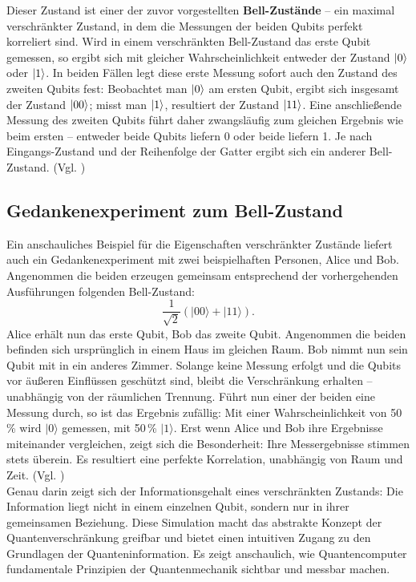 Dieser Zustand ist einer der zuvor vorgestellten \textbf{Bell-Zustände} – ein maximal verschränkter Zustand, in dem die Messungen der beiden Qubits perfekt korreliert sind. Wird in einem verschränkten Bell-Zustand das erste Qubit gemessen, so ergibt sich mit gleicher Wahrscheinlichkeit entweder der Zustand \( \ket{0} \) oder \( \ket{1} \). In beiden Fällen legt diese erste Messung sofort auch den Zustand des zweiten Qubits fest: Beobachtet man \( \ket{0} \) am ersten Qubit, ergibt sich insgesamt der Zustand \( \ket{00} \); misst man \( \ket{1} \), resultiert der Zustand \( \ket{11} \). Eine anschließende Messung des zweiten Qubits führt daher zwangsläufig zum gleichen Ergebnis wie beim ersten – entweder beide Qubits liefern 0 oder beide liefern 1. Je nach Eingangs-Zustand und der Reihenfolge der Gatter ergibt sich ein anderer Bell-Zustand. (Vgl. \cite[S.53-54]{homeister_quantum_2022})

\subsection{Gedankenexperiment zum Bell-Zustand}
Ein anschauliches Beispiel für die Eigenschaften verschränkter Zustände liefert auch ein Gedankenexperiment mit zwei beispielhaften Personen, Alice und Bob. Angenommen die beiden erzeugen gemeinsam entsprechend der vorhergehenden Ausführungen folgenden Bell-Zustand:
\[
\frac{1}{\sqrt{2}} (|00\rangle + |11\rangle).
\]
Alice erhält nun das erste Qubit, Bob das zweite Qubit. Angenommen die beiden befinden sich ursprünglich in einem Haus im gleichen Raum. Bob nimmt nun sein Qubit mit in ein anderes Zimmer. Solange keine Messung erfolgt und die Qubits vor äußeren Einflüssen geschützt sind, bleibt die Verschränkung erhalten – unabhängig von der räumlichen Trennung. Führt nun einer der beiden eine Messung durch, so ist das Ergebnis zufällig: Mit einer Wahrscheinlichkeit von 50\,\% wird $|0\rangle$ gemessen, mit 50\,\% $|1\rangle$. Erst wenn Alice und Bob ihre Ergebnisse miteinander vergleichen, zeigt sich die Besonderheit: Ihre Messergebnisse stimmen stets überein. Es resultiert eine perfekte Korrelation, unabhängig von Raum und Zeit. (Vgl. \cite[S.54]{homeister_quantum_2022})
\\


Genau darin zeigt sich der Informationsgehalt eines verschränkten Zustands: Die Information liegt nicht in einem einzelnen Qubit, sondern nur in ihrer gemeinsamen Beziehung. Diese Simulation macht das abstrakte Konzept der Quantenverschränkung greifbar und bietet einen intuitiven Zugang zu den Grundlagen der Quanteninformation. Es zeigt anschaulich, wie Quantencomputer fundamentale Prinzipien der Quantenmechanik sichtbar und messbar machen. 

